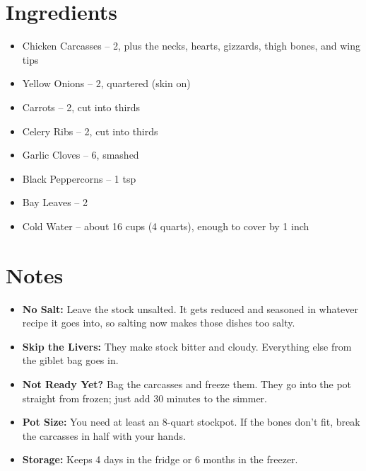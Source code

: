 




\section*{Ingredients}

\begin{itemize}
      \item Chicken Carcasses – 2, plus the necks, hearts, gizzards, thigh bones, and wing tips
      \item[\cut] Yellow Onions – 2, quartered (skin on)
      \item[\cut] Carrots – 2, cut into thirds
      \item[\cut] Celery Ribs – 2, cut into thirds
      \item[\cut] Garlic Cloves – 6, smashed
      \item[\measure] Black Peppercorns – 1 tsp
      \item Bay Leaves – 2
      \item Cold Water – about 16 cups (4 quarts), enough to cover by 1 inch
\end{itemize}

\section*{Notes}

\begin{itemize}
      \item \textbf{No Salt:} Leave the stock unsalted. It gets reduced and seasoned in whatever recipe it goes into, so salting now makes those dishes too salty.
      \item \textbf{Skip the Livers:} They make stock bitter and cloudy. Everything else from the giblet bag goes in.
      \item \textbf{Not Ready Yet?} Bag the carcasses and freeze them. They go into the pot straight from frozen; just add 30 minutes to the simmer.
      \item \textbf{Pot Size:} You need at least an 8-quart stockpot. If the bones don't fit, break the carcasses in half with your hands.
      \item \textbf{Storage:} Keeps 4 days in the fridge or 6 months in the freezer.
\end{itemize}

